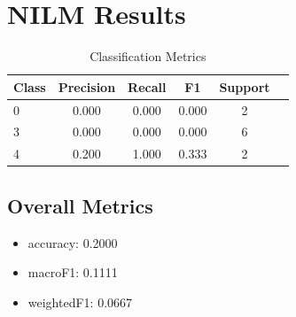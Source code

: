 \documentclass{article}
\begin{document}
\section{NILM Results}

\begin{table}[h]
\centering
\caption{Classification Metrics}
\begin{tabular}{lccccc}
\toprule
Class & Precision & Recall & F1 & Support \\
\midrule
0 & 0.000 & 0.000 & 0.000 & 2 \\
3 & 0.000 & 0.000 & 0.000 & 6 \\
4 & 0.200 & 1.000 & 0.333 & 2 \\
\bottomrule
\end{tabular}
\end{table}

\subsection{Overall Metrics}
\begin{itemize}
\item accuracy: 0.2000
\item macroF1: 0.1111
\item weightedF1: 0.0667
\end{itemize}
\end{document}
